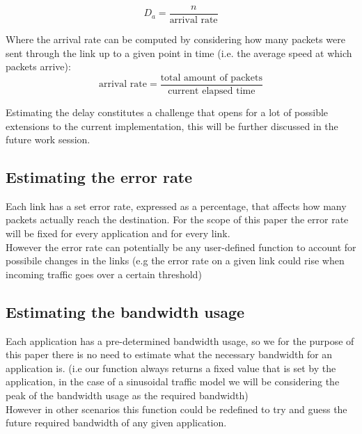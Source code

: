 \[
	D_a =  \frac {n} {\text{arrival rate}}
\]

Where the arrival rate can be computed by considering how many packets were sent through the link up to a given point in time (i.e. the average speed at which packets arrive):
\[
	\text{arrival rate} = \frac {\text{total amount of packets}} {\text{current elapsed time}}
\]

Estimating the delay constitutes a challenge that opens for a lot of possible extensions to the current implementation, this will be further discussed in the future work session.


\subsection{Estimating the error rate} \label{estimating_the_error_rate}

Each link has a set error rate, expressed as a percentage, that affects how many packets actually reach the destination. For the scope of this paper the error rate will be fixed for every application and for every link. \\
However the error rate can potentially be any user-defined function to account for possibile changes in the links (e.g the error rate on a given link could rise when incoming traffic goes over a certain threshold)



\subsection{Estimating the bandwidth usage} \label{estimating_the_bandwidth_usage}

Each application has a pre-determined bandwidth usage, so we for the purpose of this paper there is no need to estimate what the necessary bandwidth for an application is. (i.e our function always returns a fixed value that is set by the application, in the case of a sinusoidal traffic model we will be considering the peak of the bandwidth usage as the required bandwidth) \\
However in other scenarios this function could be redefined to try and guess the future required bandwidth of any given application.